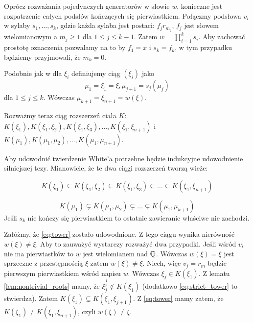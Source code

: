 Oprócz rozważania pojedynczych generatorów w słowie $w$, konieczne jest
rozpatrzenie całych podsłów kończących się pierwiastkiem. Połączmy podsłowa
$v_i$ w sylaby $s_1, \ldots, s_k$, gdzie każda sylaba jest postaci:
$f_jr_{m_j}$, $f_j$ jest słowem wielomianowym a $m_j \geq 1$ dla
$1 \leq j \leq k-1$. Zatem $w = \prod_{i=1}^k s_i$.
Aby zachować prostotę oznaczenia pozwalamy na to by $f_1 = x$  i $s_k = f_k$, w
tym przypadku będziemy przyjmowali, że $m_k = 0$.

Podobnie jak w dla $\xi_i$ definiujemy ciąg $\left(\xi_i\right)$ jako
\[\mu_1 = \xi_1 = \xi, \mu_{j+1} = s_j\left(\mu_j\right)\]
dla $1 \leq j \leq k$. Wówczas $\mu_{k+1} = \xi_{n+1} = w(\xi)$.

Rozważmy teraz ciąg rozszerzeń ciała $K$:
$
K\left(\xi_1\right),
K\left(\xi_1, \xi_2\right),
K\left(\xi_1, \xi_3\right),
\ldots,
K\left(\xi_1, \xi_{n+1}\right)$ i
$
K\left(\mu_1\right),
K\left(\mu_1, \mu_2\right),
\ldots,
K\left(\mu_1, \mu_{n+1}\right)$.

Aby udowodnić twierdzenie White'a potrzebne będzie indukcyjne udowodnienie
silniejszej tezy. Mianowicie, że te dwa ciągi rozszerzeń tworzą wieże:

\begin{equation}
K\left(\xi_1\right) \subseteq
K\left(\xi_1, \xi_2\right) \subseteq
K\left(\xi_1, \xi_3\right) \subseteq
\ldots
\subseteq
K\left(\xi_1, \xi_{n+1}\right)
\label{eq:tower}
\end{equation}

\begin{equation}
  K(\mu_1) \subsetneq
  K(\mu_1, \mu_2) \subsetneq
  \ldots \subsetneq
  K(\mu_1, \mu_{k+1})
  \label{eq:strict_tower}
\end{equation}
Jeśli $s_k$ nie kończy się pierwiastkiem to ostatnie zawieranie właściwe nie
zachodzi.

Załóżmy, że \ref{eq:tower} zostało udowodnione. Z tego ciągu wynika nierówność
$w\left(\xi\right) \neq \xi$. Aby to zauważyć wystarczy rozważyć dwa przypadki.
Jeśli wśród $v_i$ nie ma pierwiastków to $w$ jest wielomianem nad $\mathbb{Q}$. Wówczas
$w(\xi) = \xi$ jest sprzeczne z przestępnością $\xi$ zatem $w(\xi) \neq \xi$.
Niech, więc $v_j = r_m$ będzie pierwszym pierwiastkiem wśród napisu $w$. Wówczas
$\xi_j \in K\left(\xi_1\right)$. Z lematu \ref{lem:nontrivial_roots} mamy, że
$\xi_{j}^{\frac{1}{p}} \not \in K(\xi_1)$ (dodatkowo \ref{eq:strict_tower} to
stwierdza). Zatem $K\left(\xi_1\right) \subsetneq K\left(\xi_1,
\xi_{j+1}\right)$. Z \ref{eq:tower} mamy zatem, że $K\left(\xi_1\right) \neq
K\left(\xi_1, \xi_{n+1}\right)$, czyli $w(\xi) \neq \xi$.

